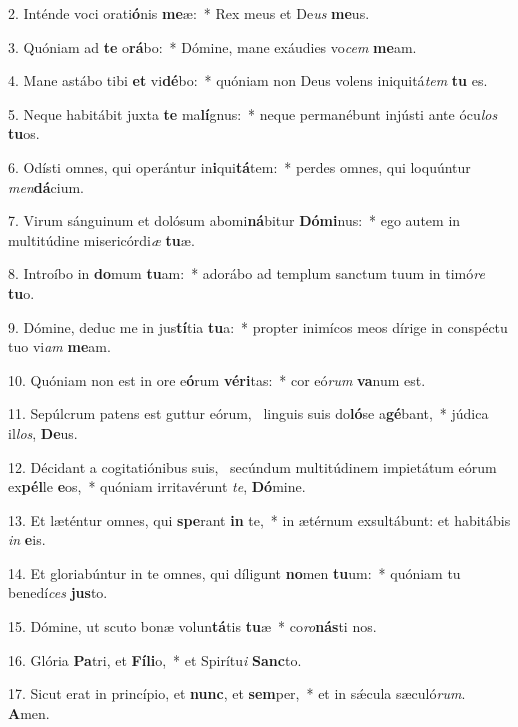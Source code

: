 2. Inténde voci orati\textbf{ó}nis \textbf{me}æ:~*  Rex meus et De\textit{us} \textbf{me}us.\

3. Quóniam ad \textbf{te} o\textbf{rá}bo:~*  Dómine, mane exáudies vo\textit{cem} \textbf{me}am.\

4. Mane astábo tibi \textbf{et} vi\textbf{dé}bo:~*  quóniam non Deus volens iniquitá\textit{tem} \textbf{tu} es.\

5. Neque habitábit juxta \textbf{te} ma\textbf{lí}gnus:~*  neque permanébunt injústi ante ócu\textit{los} \textbf{tu}os.\

6. Odísti omnes, qui operántur in\textbf{i}qui\textbf{tá}tem:~*  perdes omnes, qui loquúntur \textit{men}\textbf{dá}cium.\

7. Virum sánguinum et dolósum abomi\textbf{ná}bitur \textbf{Dó}\textbf{mi}nus:~*  ego autem in multitúdine misericórdi\textit{æ} \textbf{tu}æ.\

8. Introíbo in \textbf{do}mum \textbf{tu}am:~*  adorábo ad templum sanctum tuum in timó\textit{re} \textbf{tu}o.\

9. Dómine, deduc me in jus\textbf{tí}tia \textbf{tu}a:~*  propter inimícos meos dírige in conspéctu tuo vi\textit{am} \textbf{me}am.\

10. Quóniam non est in ore e\textbf{ó}rum \textbf{vé}\textbf{ri}tas:~*  cor eó\textit{rum} \textbf{va}num est.\

11. Sepúlcrum patens est guttur eórum, \dag\  linguis suis do\textbf{ló}se a\textbf{gé}bant,~*  júdica il\textit{los}, \textbf{De}us.\

12. Décidant a cogitatiónibus suis, \dag\  secúndum multitúdinem impietátum eórum ex\textbf{pél}le \textbf{e}os,~*  quóniam irritavérunt \textit{te}, \textbf{Dó}mine.\

13. Et læténtur omnes, qui \textbf{spe}rant \textbf{in} te,~*  in ætérnum exsultábunt: et habitábis \textit{in} \textbf{e}is.\

14. Et gloriabúntur in te omnes, qui díligunt \textbf{no}men \textbf{tu}um:~*  quóniam tu benedí\textit{ces} \textbf{jus}to.\

15. Dómine, ut scuto bonæ volun\textbf{tá}tis \textbf{tu}æ~*  co\textit{ro}\textbf{nás}ti nos.\

16. Glória \textbf{Pa}tri, et \textbf{Fí}\textbf{li}o,~*  et Spirítu\textit{i} \textbf{Sanc}to.\

17. Sicut erat in princípio, et \textbf{nunc}, et \textbf{sem}per,~*  et in sǽcula sæculó\textit{rum}. \textbf{A}men.\

